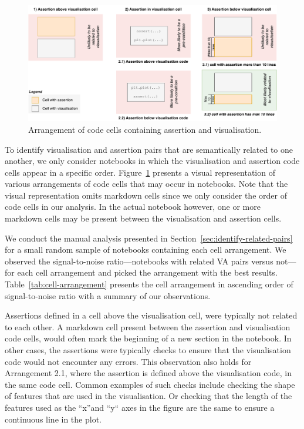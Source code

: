 \documentclass[conference]{IEEEtran}
\begin{document}
\begin{figure}
  \centering
  \includegraphics[width=\linewidth]{nb-structure.pdf}
  \caption{Arrangement of code cells containing assertion and
    visualisation.}\label{fig:cell-arrangement}
\end{figure}

To identify visualisation and assertion pairs that are semantically related to one another, we only consider notebooks in which the visualisation and assertion code cells appear in a specific order. Figure~\ref{fig:cell-arrangement} presents a visual representation of various arrangements of code cells that may occur in notebooks. Note that the visual representation omits markdown cells since we only consider the order of code cells in our analysis. In the actual notebook however, one or more markdown cells may be present between the visualisation and assertion cells.

We conduct the manual analysis presented in Section~\ref{sec:identify-related-pairs} for a small random sample of notebooks containing each cell arrangement. We observed the signal-to-noise ratio---notebooks with related VA pairs versus not---for each cell arrangement and picked the arrangement with the best results. Table~\ref{tab:cell-arrangement} presents the cell arrangement in ascending order of signal-to-noise ratio with a summary of our observations.

Assertions defined in a cell above the visualisation cell, were typically not related to each other. A markdown cell present between the assertion and visualisation code cells, would often mark the beginning of a new section in the notebook. In other cases, the assertions were typically checks to ensure that the visualisation code would not encounter any errors. This observation also holds for Arrangement 2.1, where the assertion is defined above the visualisation code, in the same code cell. Common examples of such checks include checking the shape of features that are used in the visualisation. Or checking that the length of the features used as the ``x''and ``y`` axes in the figure are the same to ensure a continuous line in the plot.
\end{document}
